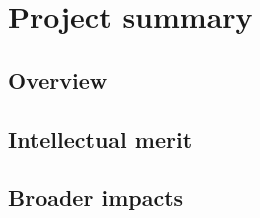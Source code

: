 \section{Project summary}

\subsection{Overview}

\subsection{Intellectual merit}

\subsection{Broader impacts}
